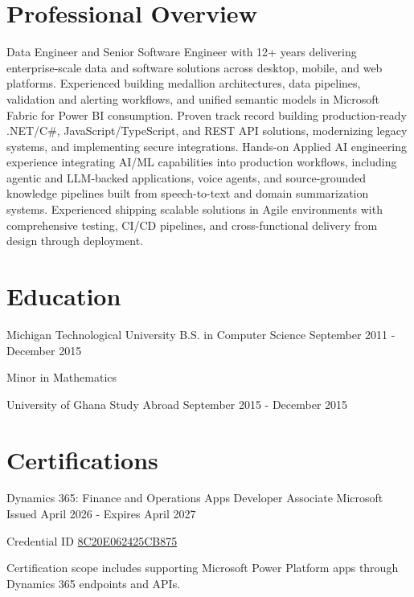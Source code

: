 \documentclass{../styles/cv}
\begin{document}
\populatedtitle

\section{Professional Overview}
    Data Engineer and Senior Software Engineer with 12+ years delivering enterprise-scale data and software solutions across desktop, mobile, and web platforms. Experienced building medallion architectures, data pipelines, validation and alerting workflows, and unified semantic models in Microsoft Fabric for Power BI consumption. Proven track record building production-ready .NET/C\#, JavaScript/TypeScript, and REST API solutions, modernizing legacy systems, and implementing secure integrations. Hands-on Applied AI engineering experience integrating AI/ML capabilities into production workflows, including agentic and LLM-backed applications, voice agents, and source-grounded knowledge pipelines built from speech-to-text and domain summarization systems. Experienced shipping scalable solutions in Agile environments with comprehensive testing, CI/CD pipelines, and cross-functional delivery from design through deployment.

\section{Education}
\subsectionpositiondate
    {Michigan Technological University}
    {B.S. in Computer Science}
    {September 2011 - December 2015}
\resumesublistbegin
    \item Minor in Mathematics
\resumesublistend

\subsectionpositiondate
    {University of Ghana}
    {Study Abroad}
    {September 2015 - December 2015}


\section{Certifications}
\subsectionpositiondate
    {Dynamics 365: Finance and Operations Apps Developer Associate}
    {Microsoft}
    {Issued April 2026 - Expires April 2027}
\resumesublistbegin
    \item Credential ID \href{https://learn.microsoft.com/en-us/users/marvinkassabian-5833/credentials/8c20e062425cb875}{8C20E062425CB875}
    \item Certification scope includes supporting Microsoft Power Platform apps through Dynamics 365 endpoints and APIs.
\resumesublistend
\end{document}
